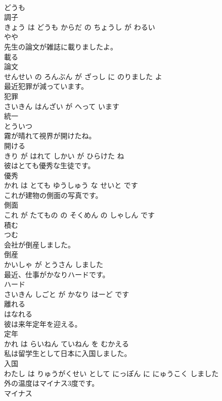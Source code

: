\documentclass[8pt]{extreport}
\begin{document}
\begin{CJK}{UTF8}{min}
\\	どうも 
\\	調子 
\\	きょう は どうも からだ の ちょうし が わるい			
\\	やや	
\\	先生の論文が雑誌に載りましたよ。	
\\	載る 
\\	論文 
\\	せんせい の ろんぶん が ざっし に のりました よ			
\\	最近犯罪が減っています。	
\\	犯罪 
\\	さいきん はんざい が へって います			
\\	統一	
\\	とういつ		
\\	霧が晴れて視界が開けたね。	
\\	開ける 
\\	きり が はれて しかい が ひらけた ね			
\\	彼はとても優秀な生徒です。	
\\	優秀 
\\	かれ は とても ゆうしゅう な せいと です			
\\	これが建物の側面の写真です。	
\\	側面 
\\	これ が たてもの の そくめん の しゃしん です			
\\	積む	
\\	つむ		
\\	会社が倒産しました。	
\\	倒産 
\\	かいしゃ が とうさん しました			
\\	最近、仕事がかなりハードです。	
\\	ハード 
\\	さいきん しごと が かなり はーど です			
\\	離れる	
\\	はなれる		
\\	彼は来年定年を迎える。	
\\	定年 
\\	かれ は らいねん ていねん を むかえる			
\\	私は留学生として日本に入国しました。	
\\	入国 
\\	わたし は りゅうがくせい として にっぽん に にゅうこく しました			
\\	外の温度はマイナス3度です。	
\\	マイナス 

\end{CJK}
\end{document}
